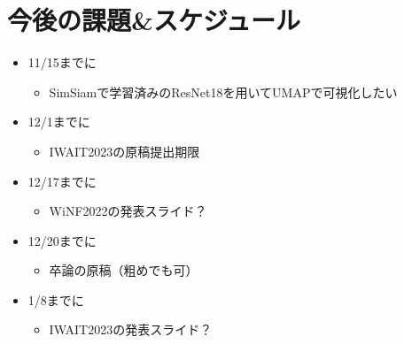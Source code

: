 \documentclass{ujarticle}
\begin{document}
    \section{今後の課題\&スケジュール}
        \begin{itemize}
            \item 11/15までに
            \begin{itemize}
                \item SimSiamで学習済みのResNet18を用いてUMAPで可視化したい
            \end{itemize}
            \item 12/1までに
            \begin{itemize}
                \item IWAIT2023の原稿提出期限
            \end{itemize}
            \item 12/17までに
            \begin{itemize}
                \item WiNF2022の発表スライド？
            \end{itemize}
            \item 12/20までに
            \begin{itemize}
                \item 卒論の原稿（粗めでも可）
            \end{itemize}
            \item 1/8までに
            \begin{itemize}
                \item IWAIT2023の発表スライド？
            \end{itemize}
        \end{itemize}

    
    
\end{document}
